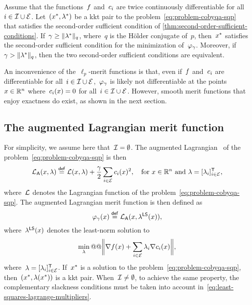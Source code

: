 \begin{theorem}
    \label{thm:exact-merit-function}
    Assume that the functions~$f$ and~$c_{i}$ are twice continuously differentiable for all~$i \in \mathcal{I} \cup \mathcal{E}$.
    Let~$(\iter[\ast], \lm[\ast])$ be a \gls{kkt} pair to the problem~\cref{eq:problem-cobyqa-sqp} that satisfies the second-order sufficient condition of \cref{thm:second-order-sufficient-conditions}.
    If~$\gamma \ge \norm{\lm[\ast]}_q$, where~$q$ is the H{\"{o}}lder conjugate of~$p$, then~$\iter[\ast]$ satisfies the second-order sufficient condition for the minimization of~$\merit_{\gamma}$.
    Moreover, if~$\gamma > \norm{\lm[\ast]}_q$, then the two second-order sufficient conditions are equivalent.
\end{theorem}

An inconvenience of the~$\ell_p$-merit functions is that, even if~$f$ and~$c_{i}$ are differentiable for all~$i \in \mathcal{I} \cup \mathcal{E}$,~$\merit_{\gamma}$ is likely not differentiable at the points~$\iter \in \R^n$ where~$\con{i}(\iter) = 0$ for all~$i \in \mathcal{I} \cup \mathcal{E}$.
However, smooth merit functions that enjoy exactness do exist, as shown in the next section.

\subsection{The augmented Lagrangian merit function}

For simplicity, we assume here that~$\mathcal{I} = \emptyset$.
The augmented Lagrangian~\cite{Hestenes_1969,Powell_1969,Rockafellar_1973,Rockafellar_2022} of the problem~\cref{eq:problem-cobyqa-sqp} is then
\begin{equation*}
    \auglag(\iter, \lm) \eqdef \lag(\iter, \lm) + \frac{\gamma}{2} \sum_{i \in \ieq} \con{i}(\iter)^2, \quad \text{for~$\iter \in \R^n$ and~$\lm = [\lm_i]_{i \in \ieq}^{\T}$,}
\end{equation*}
where~$\lag$ denotes the Lagrangian function of the problem~\cref{eq:problem-cobyqa-sqp}.
The augmented Lagrangian merit function is then defined as
\begin{equation*}
    \merit_{\gamma}(\iter) \eqdef \auglag(\iter, \lm[\mathsf{LS}](\iter)),
\end{equation*}
where~$\lm[\mathsf{LS}](\iter)$ denotes the least-norm solution to
\begin{equation}
    \label{eq:least-squares-lagrange-multipliers}
    \min_{\lm} @@ \norm[\bigg]{\nabla \obj(\iter) + \sum_{i \in \ieq} \lm_i \nabla \con{i}(x)},
\end{equation}
where~$\lm = [\lm_i]_{i \in \ieq}^{\T}$.
If~$\iter[\ast]$ is a solution to the problem~\cref{eq:problem-cobyqa-sqp}, then~$(\iter[\ast], \lm(\iter[\ast]))$ is a \gls{kkt} pair.
When~$\mathcal{I} \neq \emptyset$, to achieve the same property, the complementary slackness conditions must be taken into account in~\cref{eq:least-squares-lagrange-multipliers}.

